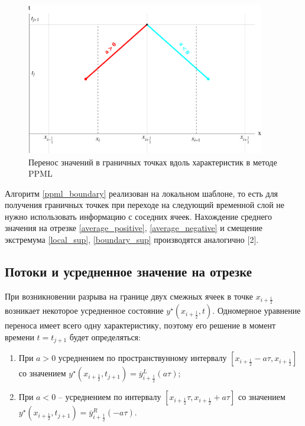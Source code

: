 \documentclass[12pt,a4paper]{article}
\newcommand{\half}{\frac{1}{2}}
\begin{document}
    \begin{figure}[h]
        \centering
        \includegraphics[width=0.93\textwidth]{ppml_visual.pdf}
        \caption{Перенос значений в граничных точках вдоль характеристик в методе PPML}
        \label{fig:ppml_visual}
    \end{figure}

    Алгоритм \eqref{ppml_boundary} реализован на локальном шаблоне, то есть для получения граничных точкек при переходе на следующий временной слой не нужно использовать информацию с соседних ячеек. Нахождение среднего значения на отрезке \eqref{average_positive}, \eqref{average_negative} и смещение экстремума \eqref{local_sup}, \eqref{boundary_sup} производятся аналогично [2].


    \subsection{Потоки и усредненное значение на отрезке}

    При возникновении разрыва на границе двух смежных ячеек в точке $ x_{i+\half} $ возникает некоторое усредненное состояние $ y^\star(x_{i+\half}, t) $. Одномерное уравнение переноса имеет всего одну характеристику, поэтому его решение в момент времени $ t = t_{j+1} $ будет определяться:
    \begin{enumerate}
        \item При $ a > 0 $ усреднением по пространствунному интервалу $ [x_{i+\half}-a \tau, x_{i+\half}] $ со значением $ y^\star(x_{i+\half}, t_{j+1}) = \overline y_{i+\half}^L(a \tau) $;
        
        \item При $ a < 0 $ -- усреднением по интервалу $ [x_{i+\half} \tau, x_{i+\half}+a \tau] $ со значением $ y^\star(x_{i+\half}, t_{j+1}) = \overline y_{i+\half}^R(-a \tau) $.
    \end{enumerate}
\end{document}
